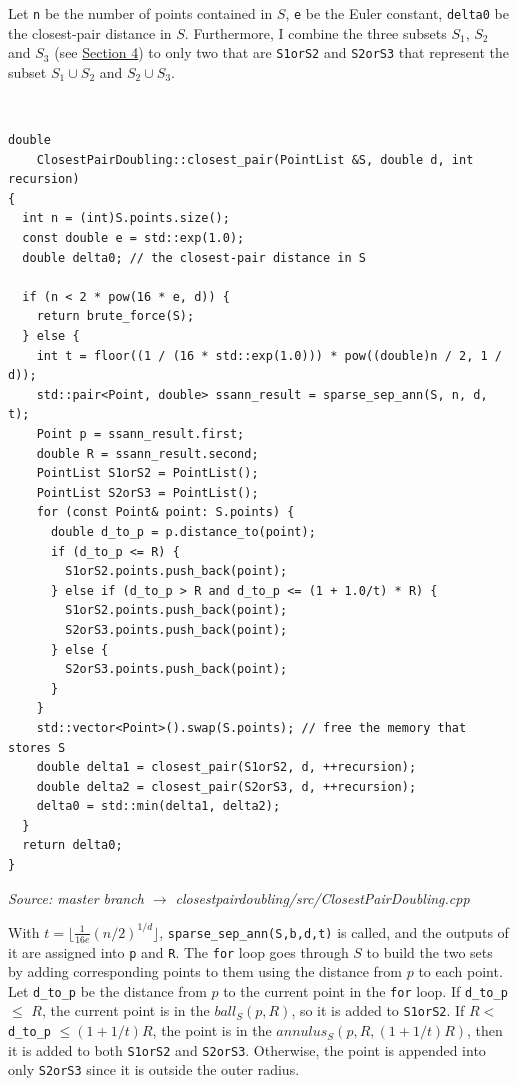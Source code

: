 \documentclass[12pt,english,]{article}
\newcommand{\code}[1]{\colorbox{light-gray}{\texttt{#1}}}
\begin{document}
Let \code{n} be the number of points contained in \(S\), \code{e} be the
Euler constant, \code{delta0} be the closest-pair distance in \(S\).
Furthermore, I combine the three subsets \(S_1\), \(S_2\) and \(S_3\)
(see \protect\hyperlink{section4}{Section 4}) to only two that are
\code{S1orS2} and \code{S2orS3} that represent the subset
\(S_1 \cup S_2\) and \(S_2 \cup S_3\).

~

\begin{lstlisting}
double
    ClosestPairDoubling::closest_pair(PointList &S, double d, int recursion)
{
  int n = (int)S.points.size();
  const double e = std::exp(1.0);
  double delta0; // the closest-pair distance in S

  if (n < 2 * pow(16 * e, d)) {
    return brute_force(S);
  } else {
    int t = floor((1 / (16 * std::exp(1.0))) * pow((double)n / 2, 1 / d));
    std::pair<Point, double> ssann_result = sparse_sep_ann(S, n, d, t);
    Point p = ssann_result.first;
    double R = ssann_result.second;
    PointList S1orS2 = PointList();
    PointList S2orS3 = PointList();
    for (const Point& point: S.points) {
      double d_to_p = p.distance_to(point);
      if (d_to_p <= R) {
        S1orS2.points.push_back(point);
      } else if (d_to_p > R and d_to_p <= (1 + 1.0/t) * R) {
        S1orS2.points.push_back(point);
        S2orS3.points.push_back(point);
      } else {
        S2orS3.points.push_back(point);
      }
    }
    std::vector<Point>().swap(S.points); // free the memory that stores S
    double delta1 = closest_pair(S1orS2, d, ++recursion);
    double delta2 = closest_pair(S2orS3, d, ++recursion);
    delta0 = std::min(delta1, delta2);
  }
  return delta0;
}
\end{lstlisting}
\vspace{-9truemm}
\begin{minipage}{1\textwidth}
  \begin{flushright}
  {\footnotesize \emph{Source: master branch $\rightarrow$ closestpairdoubling/src/ClosestPairDoubling.cpp}\par}
  \end{flushright}
\end{minipage}
\vspace{0.5truemm}

With \(t = \lfloor \frac{1}{16e}(n/2)^{1/d}\rfloor\),
\code{sparse\_sep\_ann(S,b,d,t)} is called, and the outputs of it are
assigned into \code{p} and \code{R}. The \code{for} loop goes through
\(S\) to build the two sets by adding corresponding points to them using
the distance from \(p\) to each point. Let \code{d\_to\_p} be the
distance from \(p\) to the current point in the \code{for} loop. If
\code{d\_to\_p} \(\leq\) \(R\), the current point is in the
\(ball_S(p, R)\), so it is added to \code{S1orS2}. If \(R <\)
\code{d\_to\_p} \(\leq (1 + 1/t)R\), the point is in the
\(annulus_S(p, R, (1+1/t)R)\), then it is added to both \code{S1orS2}
and \code{S2orS3}. Otherwise, the point is appended into only
\code{S2orS3} since it is outside the outer radius.
\end{document}
